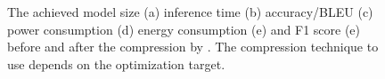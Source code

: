 \begin{figure}[!t]
\centering
{}
\hfill
{}
\hfill
{}
\hfill
{}
\hfill
{}
\hfill

\caption{The achieved model size (a) inference time (b) accuracy/BLEU (c) power consumption (d) 
energy consumption (e) and F1 score (e) before and after the compression by \pruning.
The compression technique to use depends on the optimization target.}
\label{fig:analy_prun}
\end{figure}